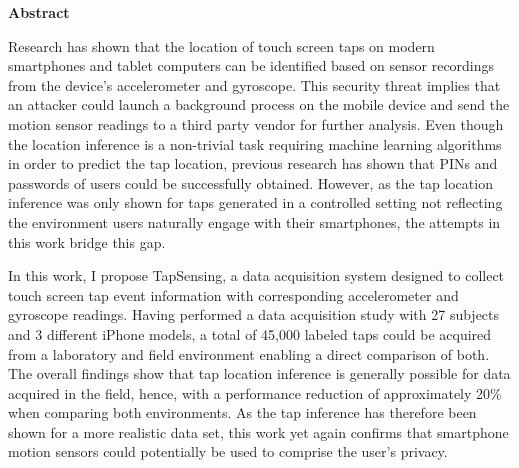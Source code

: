 \thispagestyle{empty}
\vspace*{1.0cm}

\begin{center}
    \textbf{Abstract}
\end{center}

\vspace*{0.5cm}

\noindent

Research has shown that the location of touch screen taps on modern smartphones and tablet computers can be identified based on sensor recordings from the device's accelerometer and gyroscope. This security threat implies that an attacker could launch a background process on the mobile device and send the motion sensor readings to a third party vendor for further analysis. Even though the location inference is a non-trivial task requiring machine learning algorithms in order to predict the tap location, previous research has shown that PINs and passwords of users could be successfully obtained. However, as the tap location inference was only shown for taps generated in a controlled setting not reflecting the environment users naturally engage with their smartphones, the attempts in this work bridge this gap.

In this work, I propose TapSensing, a data acquisition system designed to collect touch screen tap event information with corresponding accelerometer and gyroscope readings. Having performed a data acquisition study with 27 subjects and 3 different iPhone models, a total of 45,000 labeled taps could be acquired from a laboratory and field environment enabling a direct comparison of both. The overall findings show that tap location inference is generally possible for data acquired in the field, hence, with a performance reduction of approximately 20\% when comparing both environments. As the tap inference has therefore been shown for a more realistic data set, this work yet again confirms that smartphone motion sensors could potentially be used to comprise the user's privacy.